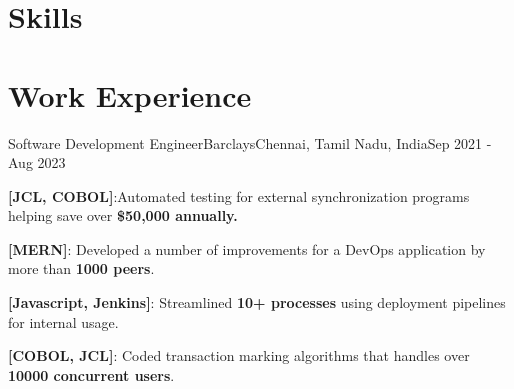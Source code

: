 \documentclass[letterpaper]{resume_config}
\begin{document}
\section{Skills}


\section{Work Experience}

\WorkExperience
    {Software Development Engineer}{Barclays}{Chennai, Tamil Nadu, India}{Sep 2021 - Aug 2023}
    {
        \item {\textbf{[JCL, COBOL]}:Automated testing for external synchronization programs helping save over \textbf{\$50,000 annually.}}
        \item {\textbf{[MERN]}: {Developed a number of improvements for a DevOps application by more than \textbf{1000 peers}.}} 
        \item {\textbf{[Javascript, Jenkins]}: Streamlined \textbf{10+ processes} using deployment pipelines for internal usage.}
        \item {\textbf{[COBOL, JCL]}: Coded transaction marking algorithms that handles over \textbf{10000 concurrent users}.}
    }

\end{document}
